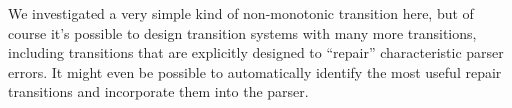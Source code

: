 \documentclass[11pt,letterpaper]{article}
\begin{document}
We investigated a very simple kind of non-monotonic transition here, but of course it's
possible to design transition systems with many more transitions, including transitions
that are explicitly designed to ``repair'' characteristic parser errors.  It might even
be possible to automatically identify the most useful repair transitions and incorporate them
into the parser.



\end{document}
